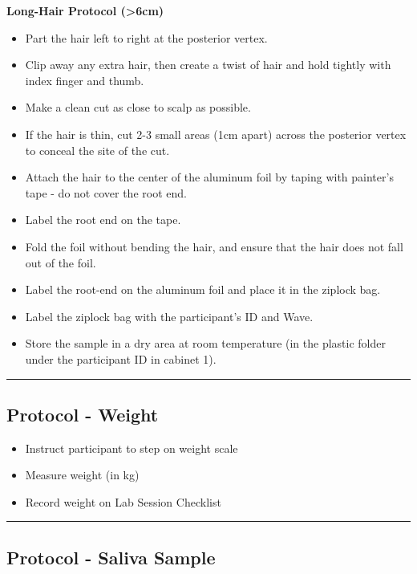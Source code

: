 \documentclass[]{book}
\providecommand{\tightlist}{%
  \setlength{\itemsep}{0pt}\setlength{\parskip}{0pt}}
\begin{document}
\textbf{Long-Hair Protocol (\textgreater{}6cm)}

\begin{itemize}
\tightlist
\item
  Part the hair left to right at the posterior vertex.
\item
  Clip away any extra hair, then create a twist of hair and hold tightly with index finger and thumb.
\item
  Make a clean cut as close to scalp as possible.
\item
  If the hair is thin, cut 2-3 small areas (1cm apart) across the posterior vertex to conceal the site of the cut.
\item
  Attach the hair to the center of the aluminum foil by taping with painter's tape - do not cover the root end.
\item
  Label the root end on the tape.
\item
  Fold the foil without bending the hair, and ensure that the hair does not fall out of the foil.
\item
  Label the root-end on the aluminum foil and place it in the ziplock bag.
\item
  Label the ziplock bag with the participant's ID and Wave.
\item
  Store the sample in a dry area at room temperature (in the plastic folder under the participant ID in cabinet 1).
\end{itemize}

\begin{center}\rule{0.5\linewidth}{0.5pt}\end{center}

\hypertarget{protocol---weight}{%
\subsection{Protocol - Weight}\label{protocol---weight}}

\begin{itemize}
\tightlist
\item
  Instruct participant to step on weight scale
\item
  Measure weight (in kg)
\item
  Record weight on Lab Session Checklist
\end{itemize}

\begin{center}\rule{0.5\linewidth}{0.5pt}\end{center}

\hypertarget{protocol---saliva-sample}{%
\subsection{Protocol - Saliva Sample}\label{protocol---saliva-sample}}
\end{document}
